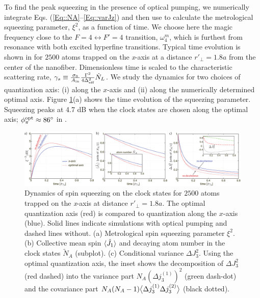 \documentclass[aps,pra,twocolumn]{revtex4-1} %
\newcommand{\varz}{\Delta J_3^2}
\newcommand{\qangle}{\phi_\pi}
\newcommand{\magic}[1]{\omega_{#1}^m}
\newcommand{\NA}{\tilde{N}_A}
\begin{document}
To find the peak squeezing in the presence of optical pumping, we numerically integrate Eqs. (\ref{Eq::NA}--\ref{Eq::varJz}) and then use  to calculate the metrological squeezing parameter, $\xi^2$, as a function of time. 
We choose here the magic frequency close to the $ F=4\leftrightarrow F'=4 $ transition, $ \magic{4} $, which is furthest from resonance with both excited hyperfine transitions. 
Typical time evolution is shown in  for $2500$ atoms trapped on the \emph{x}-axis at a distance $r'\!_\perp=1.8a$ from the center of the nanofiber. 
Dimensionless time is scaled to the characteristic scattering rate, $\gamma_s \equiv %
\frac{\sigma_0}{A_{\rm in}}\frac{\Gamma^2}{4 \Delta_\eff^2} \dot{N}_L$. 
We study the dynamics for two choices of quantization axis: (i) along the $x$-axis and (ii) along the numerically determined optimal axis. 
Figure \ref{Fig::Squeezing_Dynamics}(a) shows the time evolution of the squeezing parameter. 
Squeezing peaks at 4.7 dB when the clock states are chosen along the optimal axis; $\qangle^{\rm opt} \approx 86^\circ$ in . 

\begin{figure}[t]
\includegraphics[scale=0.42]{./Figs/Fig_SqueezingDynamics}
\caption{Dynamics of spin squeezing on the clock states for $2500$ atoms trapped on the \emph{x}-axis at distance $ r'\!_\perp=1.8a$. 
The optimal quantization axis (red) is compared to quantization along the $x$-axis (blue). 
Solid lines indicate simulations with optical pumping and dashed lines without. 
(a) Metrological spin squeezing parameter $\xi^{2}$. 
(b) Collective mean spin $\langle{\hat{J}_1}\rangle$ and decaying atom number in the clock states $\NA$ (subplot).
(c) Conditional variance $\varz$. 
Using the optimal quantization axis, the inset shows the decomposition of $ \Delta J_3^2 $ (red dashed) into the variance part $N_A (\Delta j_3^{(1)})^2$ (green dash-dot) and the covariance part $N_A(N_A-1)\big\langle \Delta j_3^{(1)}\Delta j_3^{(2)} \big\rangle$ (black dotted).
}\label{Fig::Squeezing_Dynamics}
\end{figure}
\end{document}
